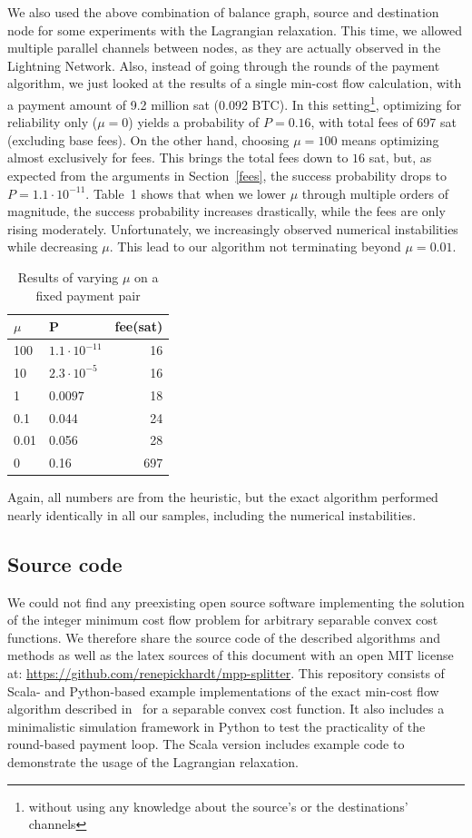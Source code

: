 \documentclass[10pt,twocolumn]{article}
\begin{document}
We also used the above combination of balance graph, source and destination node for some experiments with the Lagrangian relaxation. This time, we allowed multiple parallel channels between nodes, as they are actually observed in the Lightning Network. Also, instead of going through the rounds of the payment algorithm, we just looked at the results of a single min-cost flow calculation, with a payment amount of 9.2 million sat (0.092 BTC). In this setting\footnote{without using any knowledge about the source's or the destinations' channels}, optimizing for reliability only ($\mu=0$) yields a probability of $P=0.16$, with total fees of 697 sat (excluding base fees). On the other hand, choosing $\mu=100$ means optimizing almost exclusively for fees. This brings the total fees down to $16$ sat, but, as expected from the arguments in Section~\ref{fees}, the success probability drops to $P=1.1\cdot10^{-11}$. Table~1 shows that when we lower $\mu$ through multiple orders of magnitude, the success probability increases drastically, while the fees are only rising moderately. Unfortunately, we increasingly observed numerical instabilities while decreasing $\mu$. This lead to our algorithm not terminating beyond $\mu=0.01$.


\begin{table}
\begin{center}
\begin{tabular}[h]{l|l|r}
  $\mu$ & P & fee(sat) \\
  \hline
  100  & $1.1\cdot10^{-11}$ & 16 \\
  10 & $2.3\cdot 10^{-5}$ & 16 \\
  1 & $0.0097$ & 18 \\
  0.1 &  0.044 & 24 \\
  0.01 & 0.056 & 28 \\
  0  & 0.16 & 697
\end{tabular}
\caption{Results of varying $\mu$ on a fixed payment pair}
\end{center}
\label{table:mu}
\end{table}

Again, all numbers are from the heuristic, but the exact algorithm performed nearly identically in all our samples, including the numerical instabilities.

\subsection{Source code}
We could not find any preexisting open source software implementing the solution of the integer minimum cost flow problem for arbitrary separable convex cost functions.
We therefore share the source code of the described algorithms and methods as well as the latex sources of this document with an open MIT license at: \url{https://github.com/renepickhardt/mpp-splitter}.
This repository consists of Scala- and Python-based example implementations of the exact min-cost flow algorithm described in~\cite[p.~556ff]{ahuja1993network} for a separable convex cost function.
It also includes a minimalistic simulation framework in Python to test the practicality of the round-based payment loop.
The Scala version includes example code to demonstrate the usage of the Lagrangian relaxation.
\end{document}
